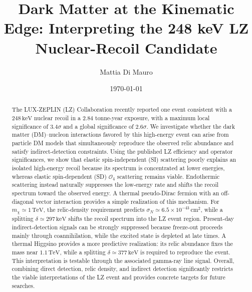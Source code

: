 \documentclass[aps,prd,reprint,superscriptaddress,nofootinbib,longbibliography,floatfix]{revtex4-2}
\newcommand{\TeV}{\mathrm{TeV}}
\newcommand{\keV}{\mathrm{keV}}
\begin{document}
\title{Dark Matter at the Kinematic Edge: Interpreting the 248 keV LZ Nuclear-Recoil Candidate}

\author{Mattia Di Mauro}


\date{\today}

\begin{abstract}
The LUX-ZEPLIN (LZ) Collaboration recently reported one event consistent with a $248\,\keV$ nuclear recoil in a $2.84$ tonne-year exposure, with a maximum local significance of $3.4\sigma$ and a global significance of $2.6\sigma$. We investigate whether the dark matter (DM)--nucleon interactions favored by this high-energy event can arise from particle DM models that simultaneously reproduce the observed relic abundance and satisfy indirect-detection constraints. Using the published LZ efficiency and operator significances, we show that elastic spin-independent (SI) scattering poorly explains an isolated high-energy recoil because its spectrum is concentrated at lower energies, whereas elastic spin-dependent (SD) $\mathcal{O}_4$ scattering remains viable. Endothermic scattering instead naturally suppresses the low-energy rate and shifts the recoil spectrum toward the observed energy.
A thermal pseudo-Dirac fermion with an off-diagonal vector interaction provides a simple realization of this mechanism. For $m_\chi\simeq1\,\TeV$, the relic-density requirement predicts $\sigma_N\simeq6.5\times10^{-43}\,\mathrm{cm}^2$, while a splitting $\delta\simeq297\,\keV$ shifts the recoil spectrum into the LZ event region. Present-day indirect-detection signals can be strongly suppressed because freeze-out proceeds mainly through coannihilation, while the excited state is depleted at late times. A thermal Higgsino provides a more predictive realization: its relic abundance fixes the mass near $1.1\,\TeV$, while a splitting $\delta\simeq377\,\keV$ is required to reproduce the event. This interpretation is testable through the associated gamma-ray line signal. Overall, combining direct detection, relic density, and indirect detection significantly restricts the viable interpretations of the LZ event and provides concrete targets for future searches.
\end{abstract}

\maketitle
\end{document}
